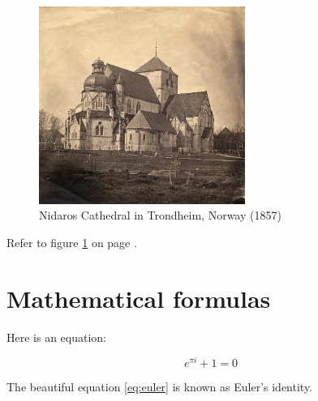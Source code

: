 \documentclass{article}
\begin{document}
\begin{figure}[htbp] %
    \centering %
    \includegraphics[width=0.6\textwidth]{images/Nidarosdom_1857.jpg}
    \caption{Nidaros Cathedral in Trondheim, Norway (1857)}
    \label{fig:nidaros}
\end{figure}

Refer to figure \ref{fig:nidaros} on page \pageref{fig:nidaros}.

\section{Mathematical formulas}

Here is an equation:

\begin{equation}
    e^{\pi i} + 1 = 0
    \label{eq:euler}
\end{equation}

The beautiful equation \ref{eq:euler} is known as Euler's identity.
\end{document}
